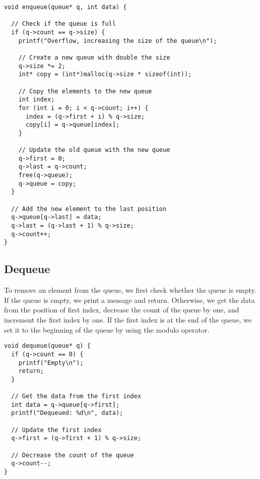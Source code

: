 \documentclass[a4paper,11pt]{article}
\begin{document}
\begin{verbatim}
void enqueue(queue* q, int data) {

  // Check if the queue is full
  if (q->count == q->size) {
    printf("Overflow, increasing the size of the queue\n");

    // Create a new queue with double the size
    q->size *= 2;
    int* copy = (int*)malloc(q->size * sizeof(int));

    // Copy the elements to the new queue
    int index;
    for (int i = 0; i < q->count; i++) {
      index = (q->first + i) % q->size;
      copy[i] = q->queue[index];
    }

    // Update the old queue with the new queue
    q->first = 0;
    q->last = q->count;
    free(q->queue);
    q->queue = copy;
  }

  // Add the new element to the last position
  q->queue[q->last] = data;
  q->last = (q->last + 1) % q->size;
  q->count++;
}
\end{verbatim}

\subsection*{Dequeue}

To remove an element from the queue, we first check whether the queue is empty.
If the queue is empty, we print a message and return. Otherwise, we get the data
from the position of first index, decrease the count of the queue by one,
and increment the first index by one. If the first index is at the end of the queue,
we set it to the beginning of the queue by using the modulo operator.

\begin{verbatim}
void dequeue(queue* q) {
  if (q->count == 0) {
    printf("Empty\n");
    return;
  }
  
  // Get the data from the first index
  int data = q->queue[q->first];
  printf("Dequeued: %d\n", data);

  // Update the first index
  q->first = (q->first + 1) % q->size;

  // Decrease the count of the queue
  q->count--;
}
\end{verbatim}
\end{document}
